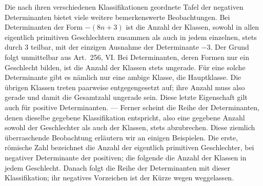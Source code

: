 Die nach ihren verschiedenen Klassifikationen geordnete Tafel der negativen Determinanten bietet viele weitere bemerkenswerte Beobachtungen. Bei Determinanten der Form \(-(8n+3)\) ist die Anzahl der Klassen, sowohl in allen eigentlich primitiven Geschlechtern zusammen als auch in jedem einzelnen, stets durch \(3\) teilbar, mit der einzigen Ausnahme der Determinante \(-3\). Der Grund folgt unmittelbar aus Art.\ 256, VI. Bei Determinanten, deren Formen nur ein Geschlecht bilden, ist die Anzahl der Klassen stets ungerade. Für eine solche Determinante gibt es nämlich nur eine ambige Klasse, die Hauptklasse. Die übrigen Klassen treten paarweise entgegengesetzt auf; ihre Anzahl muss also gerade und damit die Gesamtzahl ungerade sein. Diese letzte Eigenschaft gilt auch für positive Determinanten. — Ferner scheint die Reihe der Determinanten, denen dieselbe gegebene Klassifikation entspricht, also eine gegebene Anzahl sowohl der Geschlechter als auch der Klassen, stets abzubrechen. Diese ziemlich überraschende Beobachtung erläutern wir an einigen Beispielen. Die erste, römische Zahl bezeichnet die Anzahl der eigentlich primitiven Geschlechter, bei negativer Determinante der positiven; die folgende die Anzahl der Klassen in jedem Geschlecht. Danach folgt die Reihe der Determinanten mit dieser Klassifikation; ihr negatives Vorzeichen ist der Kürze wegen weggelassen.



